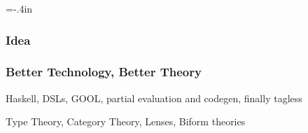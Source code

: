 \documentclass[usenames,dvipsnames,10pt]{beamer}
\begin{document}
\hoffset=-.4in %
\begin{frame}[plain] %

  
\end{frame}
\hoffset=0in %


\begin{frame}
  
  \frametitle{Idea}

\end{frame}
  
\begin{frame}
  
  \frametitle{Better Technology, Better Theory}
Haskell, DSLs, GOOL, partial evaluation and codegen, finally tagless

Type Theory, Category Theory, Lenses, Biform theories

\end{frame}
  
\end{document}
